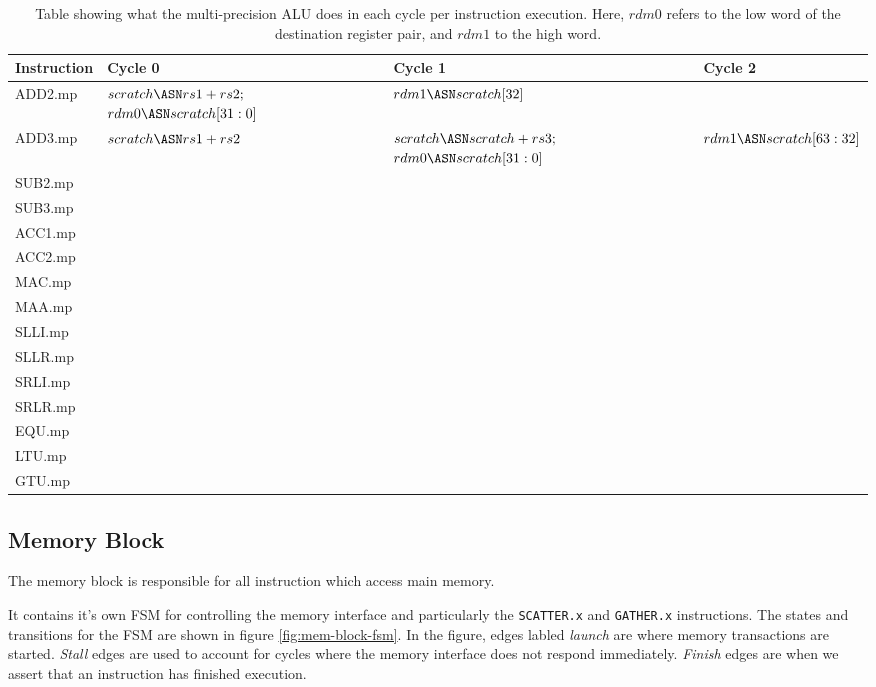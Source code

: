 \documentclass{article}
\begin{document}
\begin{table}[H]
\begin{tabularx}{\textwidth}{l Y Y Y }
\toprule
\textbf{Instruction}& \textbf{Cycle 0}& \textbf{Cycle 1}& \textbf{Cycle 2} \\
\midrule
ADD2.mp&
    $scratch \ASN rs1+rs2;$\newline 
    $rdm0\ASN scratch[31:0]$ 
 &  $rdm1\ASN scratch[32]$ 
 & \\
ADD3.mp&
   $scratch \ASN rs1 + rs2$
 & $scratch \ASN scratch + rs3;$\newline
   $rdm0\ASN scratch[31:0]$ 
 & $rdm1\ASN scratch[63:32]$ 
\\
SUB2.mp&
 &
 &
\\
SUB3.mp&
 &
 &
\\
ACC1.mp&
 &
 &
\\
ACC2.mp&
 &
 &
\\
MAC.mp &
 &
 &
\\
MAA.mp &
 &
 &
\\
SLLI.mp&
 &
 &
\\
SLLR.mp&
 &
 &
\\
SRLI.mp&
 &
 &
\\
SRLR.mp&
 &
 &
\\
EQU.mp &
 &
 &
\\
LTU.mp &
 &
 &
\\
GTU.mp &
 &
 &
\\
\bottomrule
\end{tabularx}
\caption{Table showing what the multi-precision ALU does in each cycle
per instruction execution. Here, $rdm0$ refers to the low word of the
destination register pair, and $rdm1$ to the high word.}
\label{tab:mp-alu-exec}
\end{table}

\subsection{Memory Block}

The memory block is responsible for all instruction which access main
memory.

It contains it's own FSM for controlling the memory interface
and particularly the {\tt SCATTER.x} and {\tt GATHER.x} instructions.
The states and transitions for the FSM are shown in figure 
\ref{fig:mem-block-fsm}. 
In the figure, edges labled {\em launch} are
where memory transactions are started.
{\em Stall} edges are used to
account for cycles where the memory interface does not respond immediately.
{\em Finish} edges are when we assert that an instruction has finished
execution.
\end{document}
